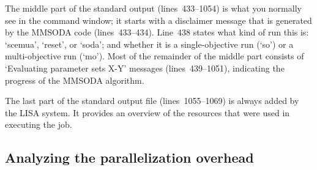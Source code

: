 The middle part of the standard output (lines~433--1054) is what you normally see in the command window; it starts with a disclaimer message that is generated by the MMSODA code (lines~433--434). Line~438 states what kind of run this is: `scemua', `reset', or `soda'; and whether it is a single-objective run (`so') or a multi-objective run (`mo'). Most of the remainder of the middle part consists of `Evaluating parameter sets X-Y' messages (lines~439--1051), indicating the progress of the MMSODA algorithm.

The last part of the standard output file (lines~1055--1069) is always added by the LISA system. It provides an overview of the resources that were used in executing the job.









\subsection{Analyzing the parallelization overhead}

